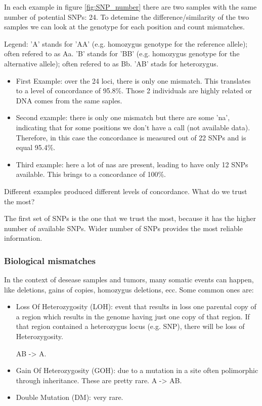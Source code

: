 In each example in figure \ref{fig:SNP_number} there are two samples with the same number of potential SNPs: 24. To detemine the difference/similarity of the two samples we can look at the genotype for each position and count mismatches.

Legend: 
'A' stands for 'AA' (e.g. homozygus genotype for the reference allele); often refered to as Aa.
'B' stands for 'BB' (e.g. homozygus genotype for the alternative allele); often refered to as Bb.
'AB' stads for heterozygus.

\begin{itemize}
	\item First Example: over the 24 loci, there is only one mismatch. This translates to a level of concordance of 95.8\%. Those 2 individuals are highly related or DNA comes from the same saples.    
	\item Second example: there is only one mismatch but there are some 'na', indicating that for some positions we don't have a call (not available data). Therefore, in this case the concordance is measured out of 22 SNPs and is equal 95.4\%. 
	\item Third example: here a lot of nas are present, leading to have only 12 SNPs available. This brings to a concordance of 100\%. 
\end{itemize}

Different examples produced different levels of concordance. What do we trust the most?

The first set of SNPs is the one that we trust the most, because it has the higher number of available SNPs. Wider number of SNPs provides the most reliable information. 

\subsubsection*{Biological mismatches}

In the context of desease samples and tumors, many somatic events can happen, like deletions, gains of copies, homozygus deletions, ecc. Some common ones are:
\begin{itemize}
	\item  Loss Of Heterozygosity (LOH):  event that results in loss one parental copy of a region which results in the genome having just one copy of that region. If that region contained a heterozygus locus (e.g. SNP), there will be loss of Heterozygosity.  
	
	AB -> A.
	\item Gain Of Heterozygosity (GOH): due to a mutation in a site often polimorphic through inheritance. These are pretty rare.
	A -> AB. 
	\item Double Mutation (DM): very rare.  
\end{itemize}

